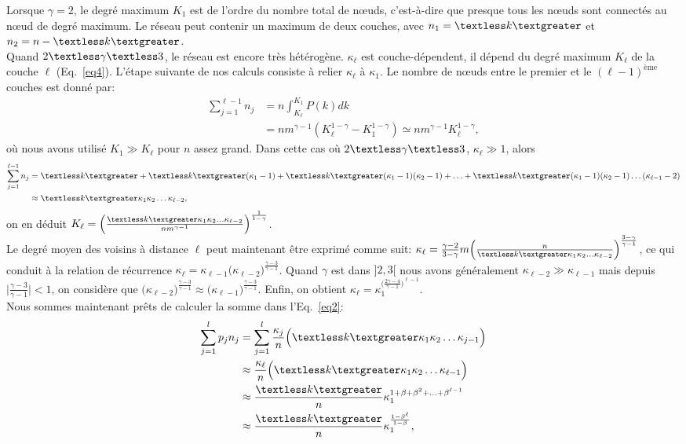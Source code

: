 Lorsque $\gamma=2$, le degré maximum $K_1$ est de l'ordre du nombre total de nœuds, c'est-à-dire que presque tous les nœuds sont connectés au nœud de degré maximum. Le réseau peut contenir un maximum de deux couches, avec $n_1=\km$ et $n_2=n-\km $. \\
Quand $2\textless \gamma \textless 3$, le réseau est encore très hétérogène. $\kappa_{\ell} $ est couche-dépendent, il dépend du degré maximum $K_{\ell} $ de la couche $\ell$ (Eq.~\eqref{eq4}). L'étape suivante de nos calculs consiste à relier $\kappa_{\ell}$ à $\kappa_1$. Le nombre de nœuds entre le premier et le $(\ell-1)^{\text{ème}}$ couches est donné par:
\begin{align}
\sum_{j=1}^{\ell-1}n_j&=n\int_{K_{\ell}}^{K_1} P(k)dk \nonumber \\
&=nm^{\gamma-1}(K_{\ell}^{1-\gamma}-K_1^{1-\gamma})\simeq nm^{\gamma-1} K_{\ell}^{1-\gamma},
\label{eq5}
\end{align}
où nous avons utilisé $K_1\gg K_{\ell}$ pour $n$ assez grand. Dans cette cas où $2\textless \gamma \textless 3$, $\kappa_{\ell}\gg 1$, alors
\begin{align}
\sum_{j=1}^{\ell-1}n_j&=\km+\km(\kappa_1-1)+\km(\kappa_1-1)(\kappa_2-1)+\ldots+\km(\kappa_1-1)(\kappa_2-1)\ldots(\kappa_{\ell-1}-2)\nonumber \\
&\approx\km\kappa_1\kappa_2\ldots\kappa_{\ell-2},
\label{eq6}
\end{align}
on en déduit
$K_{\ell}=\Big(\frac{\km\kappa_1\kappa_2\ldots\kappa_{\ell-2}}{nm^{\gamma-1}}\Big)^{\frac{1}{1-\gamma}}$.\\
Le degré moyen des voisins à distance $\ell $ peut maintenant être exprimé comme suit:
$\kappa_{\ell}=\frac{\gamma-2}{3-\gamma}m\Big(\frac{n}{\km\kappa_1\kappa_2\ldots\kappa_{\ell-2}}\Big)^{\frac{3-\gamma}{\gamma-1}}$, ce qui conduit à la relation de récurrence $\kappa_{\ell}=\kappa_{\ell-1}
\Big(\kappa_{\ell-2}\Big)^{\frac{\gamma-3}{\gamma-1}}$.  Quand $\gamma$ est dans $]2,3[$ nous avons généralement
$\kappa_{\ell-2} \gg \kappa_{\ell-1}$  mais depuis $\mid\frac{\gamma-3}{\gamma-1}\mid<1$, on considère que $\Big(\kappa_{\ell-2}\Big)^{\frac{\gamma-3}{\gamma-1}}\approx
\Big(\kappa_{\ell-1}\Big)^{\frac{\gamma-3}{\gamma-1}}$. Enfin, on obtient $\kappa_{\ell}=\kappa_1^{\Big(\frac{2\gamma-4}{\gamma-1}\Big)^{\ell-1}}$.\\
Nous sommes maintenant prêts de calculer la somme dans l'Eq.~\eqref{eq2}:
\begin{align}
\sum_{j=1}^{l} p_jn_j&=\sum_{j=1}^{l}\frac{\kappa_j}{n}\Big(\km\kappa_1\kappa_2\ldots\kappa_{j-1}\Big) \nonumber\\ 
&\approx \frac{\kappa_{\ell}}{n}\Big(\km\kappa_1\kappa_2\ldots\kappa_{\ell-1}\Big) \nonumber \\
&\approx \frac{\km}{n}\kappa_1^{1+\beta+\beta^2+\ldots+\beta^{\ell-1}} \nonumber \\
&\approx \frac{\km}{n}\kappa_1^{\frac{1-\beta^{\ell}}{1-\beta}},
\label{eq7}
\end{align}
